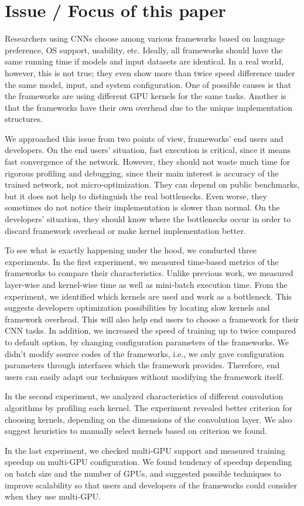 \section{Issue / Focus of this paper}
Researchers using CNNs choose among various frameworks based on language preference, OS support, usability, etc.
Ideally, all frameworks should have the same running time if models and input datasets are identical.
In a real world, however, this is not true; they even show more than twice speed difference under the same model, input, and system configuration\cite{DBLP:journals/corr/BahrampourRSS15,DBLP:journals/corr/ShiWXC16}.
One of possible causes is that the frameworks are using different GPU kernels for the same tasks.
Another is that the frameworks have their own overhead due to the unique implementation structures.

We approached this issue from two points of view, frameworks' end users and developers.
On the end users' situation, fast execution is critical, since it means fast convergence of the network.
However, they should not waste much time for rigorous profiling and debugging, since their main interest is accuracy of the trained network, not micro-optimization.
They can depend on public benchmarks, but it does not help to distinguish the real bottlenecks.
Even worse, they sometimes do not notice their implementation is slower than normal.
On the developers' situation, they should know where the bottlenecks occur in order to discard framework overhead or make kernel implementation better.

To see what is exactly happening under the hood, we conducted three experiments.
In the first experiment, we measured time-based metrics of the frameworks to compare their characteristics.
Unlike previous work, we measured layer-wise and kernel-wise time as well as mini-batch execution time.
From the experiment, we identified which kernels are used and work as a bottleneck.
This suggests developers optimization possibilities by locating slow kernels and framework overhead.
This will also help end users to choose a framework for their CNN tasks.
In addition, we increased the speed of training up to twice compared to default option, by changing configuration parameters of the frameworks.
We didn't modify source codes of the frameworks, i.e., we only gave configuration parameters through interfaces which the framework provides.
Therefore, end users can easily adapt our techniques without modifying the framework itself.

In the second experiment, we analyzed characteristics of different convolution algorithms by profiling each kernel.
The experiment revealed better criterion for choosing kernels, depending on the dimensions of the convolution layer.
We also suggest heuristics to manually select kernels based on criterion we found.

In the last experiment, we checked multi-GPU support and measured training speedup on multi-GPU configuration.
We found tendency of speedup depending on batch size and the number of GPUs, and suggested possible techniques to improve scalability so that users and developers of the frameworks could consider when they use multi-GPU.
